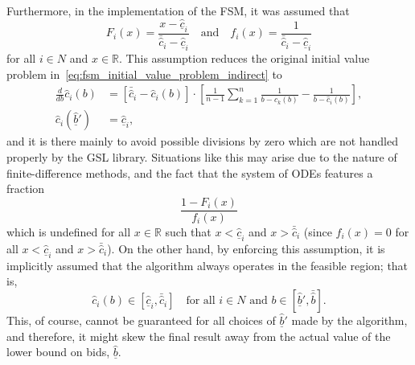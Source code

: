 Furthermore, in the implementation of the FSM, it was assumed that
\begin{equation}
  F_i(x) = \frac{x - \underline{\hat{c}}_i}{\bar{\hat{c}}_i - \underline{\hat{c}}_i} \quad\textrm{and}\quad f_i(x) = \frac{1}{\bar{\hat{c}}_i - \underline{\hat{c}}_i}
\end{equation}
for all $i\in N$ and $x\in\mathbb{R}$. This assumption reduces the original initial value problem in~\eqref{eq:fsm_initial_value_problem_indirect} to
\begin{equation}
  \begin{array}{ll}
    \displaystyle\frac{d}{db}\hat{c}_i(b) &= \displaystyle\left[ \bar{\hat{c}}_i - \hat{c}_i(b)\right]\cdot\left[ \frac{1}{n-1}\sum_{k=1}^n\frac{1}{b - \hat{c}_k(b)} - \frac{1}{b - \hat{c}_i(b)} \right], \\[2ex]
    \hat{c}_i(\underline{\hat{b}}') &= \underline{\hat{c}}_i,
  \end{array}
\end{equation}
and it is there mainly to avoid possible divisions by zero which are not handled properly by the GSL library. Situations like this may arise due to the nature of finite-difference methods, and the fact that the system of ODEs features a fraction
\begin{equation}
  \frac{1 - F_i(x)}{f_i(x)}
\end{equation}
which is undefined for all $x\in\mathbb{R}$ such that $x < \underline{\hat{c}}_i$ and $x > \bar{\hat{c}}_i$ (since $f_i(x) = 0$ for all $x < \underline{\hat{c}}_i$ and $x > \bar{\hat{c}}_i$). On the other hand, by enforcing this assumption, it is implicitly assumed that the algorithm always operates in the feasible region; that is,
\begin{equation}
  \hat{c}_i(b)\in [\underline{\hat{c}}_i, \bar{\hat{c}}_i] \quad\textrm{for all } i\in N \textrm{ and } b\in\left[\underline{\hat{b}}', \bar{\hat{b}}\right].
\end{equation}
This, of course, cannot be guaranteed for all choices of $\underline{\hat{b}}'$ made by the algorithm, and therefore, it might skew the final result away from the actual value of the lower bound on bids, $\underline{\hat{b}}$.

